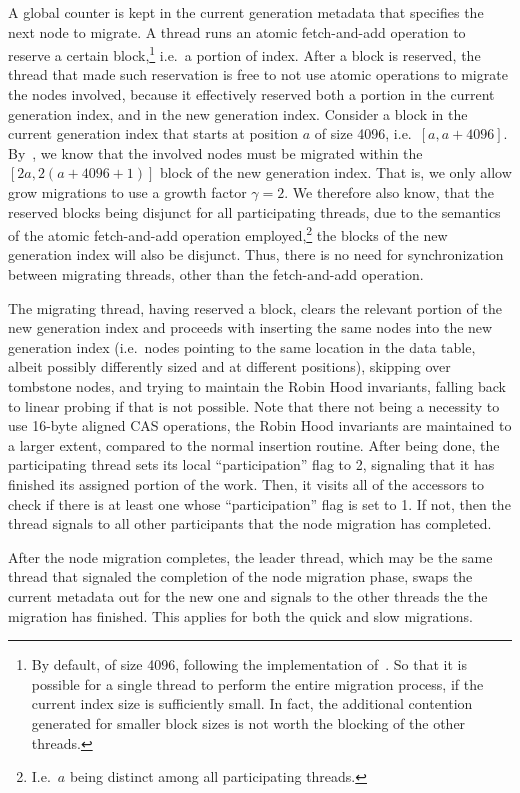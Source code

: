 A global counter is kept in the current generation metadata that specifies the next node to migrate.
A thread runs an atomic fetch-and-add operation to reserve a certain block,\footnote{%
	By default, of size 4096, following the implementation of~\cite{maier}.
	So that it is possible for a single thread to perform the entire migration process, if the current index size is sufficiently small.
	In fact, the additional contention generated for smaller block sizes is not worth the blocking of the other threads.
} i.e.\ a portion of index.
After a block is reserved, the thread that made such reservation is free to not use atomic operations to migrate the nodes involved, because it effectively reserved both a portion in the current generation index, and in the new generation index.
Consider a block in the current generation index that starts at position $a$ of size 4096, i.e.\ $[a, a + 4096]$.
By~\cite[Lemma~5.1]{maier}, we know that the involved nodes must be migrated within the $[2a, 2(a + 4096 + 1)]$ block of the new generation index.
That is, we only allow grow migrations to use a growth factor $\gamma = 2$.
We therefore also know, that the reserved blocks being disjunct for all participating threads, due to the semantics of the atomic fetch-and-add operation employed,\footnote{%
	I.e.\ $a$ being distinct among all participating threads.
} the blocks of the new generation index will also be disjunct.
Thus, there is no need for synchronization between migrating threads, other than the fetch-and-add operation.

The migrating thread, having reserved a block, clears the relevant portion of the new generation index and proceeds with inserting the same nodes into the new generation index (i.e.\ nodes pointing to the same location in the data table, albeit possibly differently sized and at different positions), skipping over tombstone nodes, and trying to maintain the Robin Hood invariants, falling back to linear probing if that is not possible.
Note that there not being a necessity to use 16-byte aligned CAS operations, the Robin Hood invariants are maintained to a larger extent, compared to the normal insertion routine.
After being done, the participating thread sets its local ``participation'' flag to 2, signaling that it has finished its assigned portion of the work.
Then, it visits all of the accessors to check if there is at least one whose ``participation'' flag is set to 1.
If not, then the thread signals to all other participants that the node migration has completed.

After the node migration completes, the leader thread, which may be the same thread that signaled the completion of the node migration phase, swaps the current metadata out for the new one and signals to the other threads the the migration has finished.
This applies for both the quick and slow migrations.


